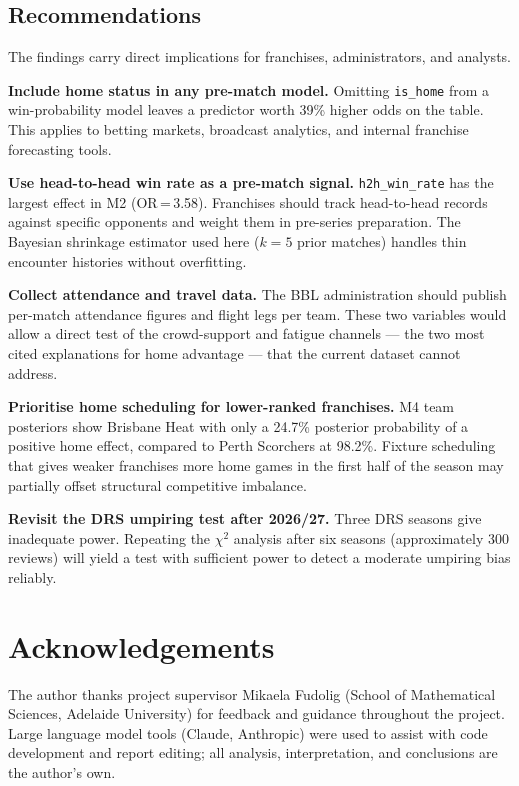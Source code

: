 \documentclass[12pt,a4paper]{article}
\begin{document}
\subsection{Recommendations}

The findings carry direct implications for franchises, administrators, and analysts.

\textbf{Include home status in any pre-match model.} Omitting \texttt{is\_home} from a
win-probability model leaves a predictor worth 39\% higher odds on the table. This applies
to betting markets, broadcast analytics, and internal franchise forecasting tools.

\textbf{Use head-to-head win rate as a pre-match signal.} \texttt{h2h\_win\_rate} has the
largest effect in M2 (OR\,=\,3.58). Franchises should track head-to-head records against
specific opponents and weight them in pre-series preparation. The Bayesian shrinkage
estimator used here ($k = 5$ prior matches) handles thin encounter histories without
overfitting.

\textbf{Collect attendance and travel data.} The BBL administration should publish
per-match attendance figures and flight legs per team. These two variables would allow a
direct test of the crowd-support and fatigue channels — the two most cited explanations
for home advantage — that the current dataset cannot address.

\textbf{Prioritise home scheduling for lower-ranked franchises.} M4 team posteriors show
Brisbane Heat with only a 24.7\% posterior probability of a positive home effect, compared
to Perth Scorchers at 98.2\%. Fixture scheduling that gives weaker franchises more home
games in the first half of the season may partially offset structural competitive imbalance.

\textbf{Revisit the DRS umpiring test after 2026/27.} Three DRS seasons give inadequate
power. Repeating the $\chi^2$ analysis after six seasons (approximately 300 reviews) will
yield a test with sufficient power to detect a moderate umpiring bias reliably.

\section*{Acknowledgements}

The author thanks project supervisor Mikaela Fudolig (School of Mathematical Sciences,
Adelaide University) for feedback and guidance throughout the project. Large language
model tools (Claude, Anthropic) were used to assist with code development and report editing;
all analysis, interpretation, and conclusions are the author's own.
\end{document}

